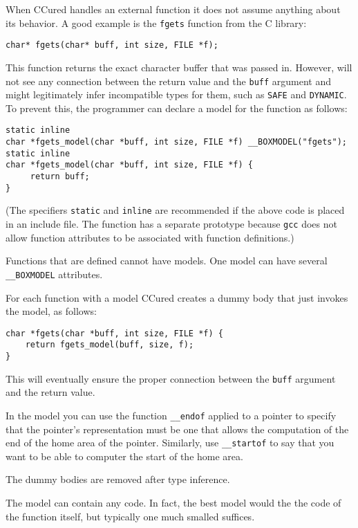 \documentclass{book}
\def\t#1{{\tt #1}}
\begin{document}
 When CCured handles an external function it does not assume anything about
its behavior. A good example is the \t{fgets} function from the C library:
\begin{verbatim}
char* fgets(char* buff, int size, FILE *f);
\end{verbatim}

 This function returns the exact character buffer that was passed in. However,
will not see any connection between the return value and the \t{buff} argument
and might legitimately infer incompatible types for them, such as \t{SAFE} and
\t{DYNAMIC}. To prevent this, the programmer can declare a model for the
function as follows:

\begin{verbatim}
static inline
char *fgets_model(char *buff, int size, FILE *f) __BOXMODEL("fgets");
static inline
char *fgets_model(char *buff, int size, FILE *f) {
     return buff;
}
\end{verbatim}

 (The specifiers \t{static} and \t{inline} are recommended if the above code
 is placed in an include file. The function has a separate prototype because
 \t{gcc} does not allow function attributes to be associated with function
 definitions.)

 Functions that are defined cannot have models. One model can have several
 \t{\_\_BOXMODEL} attributes. 

 For each function with a model CCured creates a dummy body that just invokes
 the model, as follows: 

\begin{verbatim}
char *fgets(char *buff, int size, FILE *f) {
    return fgets_model(buff, size, f);
}
\end{verbatim}

 This will eventually ensure the proper connection between the \t{buff}
argument and the return value. 

 In the model you can use the function \t{\_\_endof} applied to a pointer to
specify that the pointer's representation must be one that allows the
computation of the end of the home area of the pointer. Similarly, use
\t{\_\_startof} to say that you want to be able to computer the start of the
home area. 

 The dummy bodies are removed after type inference. 

 The model can contain any code. In fact, the best model would the the code of
 the function itself, but typically one much smalled suffices.
\end{document}
